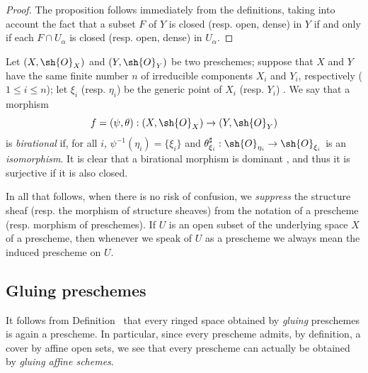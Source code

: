 \begin{proof}
The proposition follows immediately from the definitions, taking into account the fact that a subset $F$ of $Y$ is closed (resp. open, dense) in $Y$ if and only if each $F\cap U_\alpha$ is closed (resp. open, dense) in $U_\alpha$.
\end{proof}

\begin{env}[2.2.9]
\label{I.2.2.9}
Let $(X,\sh{O}_X)$ and $(Y,\sh{O}_Y)$ be two preschemes;
suppose that $X$ and $Y$ have the same finite number $n$ of irreducible components $X_i$ and $Y_i$, respectively ($1\leq i\leq n$);
let $\xi_i$ (resp. $\eta_i$) be the generic point of $X_i$ (resp. $Y_i$) .
We say that a morphism
\[
  f=(\psi,\theta):(X,\sh{O}_X)\to(Y,\sh{O}_Y)
\]
is \emph{birational} if, for all $i$, $\psi^{-1}(\eta_i)=\{\xi_i\}$ and $\theta_{\xi_i}^\sharp:\sh{O}_{\eta_i}\to\sh{O}_{\xi_i}$ is an \emph{isomorphism}.
It is clear that a birational morphism is dominant , and thus it is surjective if it is also closed.
\end{env}

\begin{notation}[2.2.10]
\label{I.2.2.10}
In all that follows, when there is no risk of confusion, we \emph{suppress} the structure sheaf (resp. the morphism of structure sheaves) from the notation of a prescheme (resp. morphism of preschemes).
If $U$ is an open subset of the underlying space $X$ of a prescheme, then whenever we speak of $U$ as a prescheme we always mean the induced prescheme on $U$.
\end{notation}

\subsection{Gluing preschemes}
\label{subsection:I.2.3}

\begin{env}[2.3.1]
\label{I.2.3.1}
It follows from Definition~ that every ringed space obtained by \emph{gluing} preschemes  is again a prescheme.
In particular, since every prescheme admits, by definition, a cover by affine open sets, we see that every prescheme can actually be obtained by \emph{gluing affine schemes}.
\end{env}

